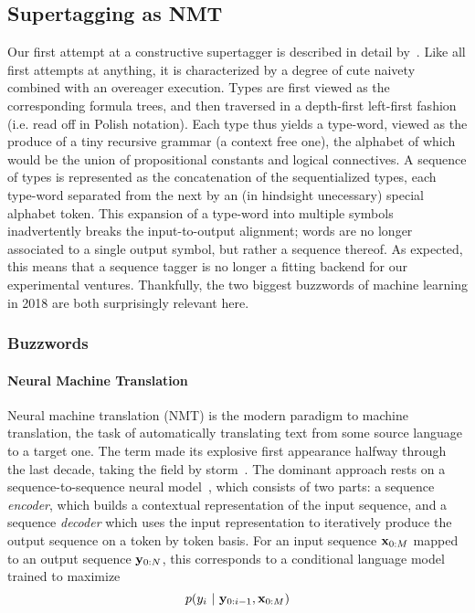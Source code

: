 \subsection{Supertagging as NMT}
\label{subsection:snmt}
Our first attempt at a constructive supertagger is described in detail by~\citet{kogkalidis-etal-2019-constructive}.
Like all first attempts at anything, it is characterized by a degree of cute naivety combined with an overeager execution.
Types are first viewed as the corresponding formula trees, and then traversed in a depth-first left-first fashion (i.e. read off in Polish notation).
Each type thus yields a type-word, viewed as the produce of a tiny recursive grammar (a context free one), the alphabet of which would be the union of propositional constants and logical connectives.
A sequence of types is represented as the concatenation of the sequentialized types, each type-word separated from the next by an (in hindsight unecessary) special alphabet token.
This expansion of a type-word into multiple symbols inadvertently breaks the input-to-output alignment; words are no longer associated to a single output symbol, but rather a sequence thereof.
As expected, this means that a sequence tagger is no longer a fitting backend for our experimental ventures.
Thankfully, the two biggest buzzwords of machine learning in 2018 are both surprisingly relevant here.

\subsubsection{Buzzwords}
\paragraph{Neural Machine Translation} Neural machine translation (NMT) is the modern paradigm to machine translation, the task of automatically translating text from some source language to a target one.
The term made its explosive first appearance halfway through the last decade, taking the field by storm~\cite{kalchbrenner2013recurrent,cho2014learning,bahdanau2015neural}.
The dominant approach rests on a sequence-to-sequence neural model~\cite{cho2014learning,NIPS2014_a14ac55a}, which consists of two parts: a sequence \textit{encoder}, which builds a contextual representation of the input sequence, and a sequence \textit{decoder} which uses the input representation to iteratively produce the output sequence on a token by token basis.
For an input sequence $\mathbf{x}_{0:M}$ mapped to an output sequence $\mathbf{y}_{0:N}$, this corresponds to a conditional language model trained to maximize
\begin{equation}
	p(y_i \ | \ \seq{y}{0:i-1},\seq{x}{0:M})
\end{equation}

